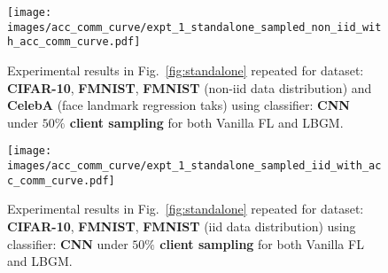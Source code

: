 \begin{figure}[t]
  \centering
    \centerline{\texttt{[image: images/acc\_comm\_curve/expt\_1\_standalone\_sampled\_non\_iid\_with\_acc\_comm\_curve.pdf]}}
  \caption{\small{Experimental results in Fig.~\ref{fig:standalone} repeated for dataset: \textbf{CIFAR-10}, \textbf{FMNIST}, \textbf{FMNIST} (non-iid data distribution) and \textbf{CelebA} (face landmark regression taks) using classifier: \textbf{CNN} under \textbf{$50\%$ client sampling} for both Vanilla FL and LBGM.}}
  \label{fig:sampled_training_cnn_non_iid}
\end{figure}

\begin{figure}[t]
  \centering
    \centerline{\texttt{[image: images/acc\_comm\_curve/expt\_1\_standalone\_sampled\_iid\_with\_acc\_comm\_curve.pdf]}}
  \caption{\small{Experimental results in Fig.~\ref{fig:standalone} repeated for dataset: \textbf{CIFAR-10}, \textbf{FMNIST}, \textbf{FMNIST} (iid data distribution) using classifier: \textbf{CNN} under \textbf{$50\%$ client sampling} for both Vanilla FL and LBGM.}}
  \label{fig:sampled_training_cnn_iid}
\end{figure}
